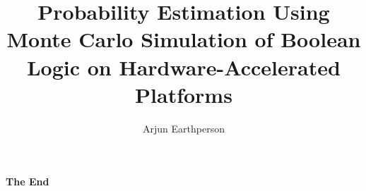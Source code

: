 \documentclass[aspectratio=169,xcolor=dvipsnames]{beamer}
\title{Probability Estimation Using Monte Carlo Simulation of Boolean Logic on Hardware-Accelerated Platforms}
\author{Arjun Earthperson}
\institute
{
    PhD Candidate, PRA Group\\
}
\begin{document}








% 
% 
% 
% 
% 
% 

%     
%     


\begin{frame}
    \Huge{\centerline{\textbf{The End}}}
\end{frame}



\end{document}
